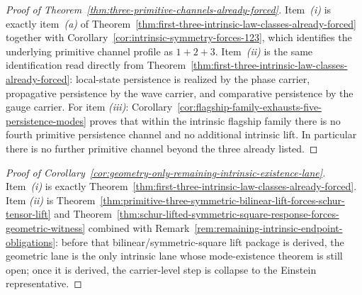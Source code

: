 \begin{proof}[Proof of Theorem~\ref{thm:three-primitive-channels-already-forced}]
\label{proof:thm:three-primitive-channels-already-forced}
Item~\emph{(i)} is exactly item~\emph{(a)} of
Theorem~\ref{thm:first-three-intrinsic-law-classes-already-forced} together
with Corollary~\ref{cor:intrinsic-symmetry-forces-123}, which identifies the
underlying primitive channel profile as \(1+2+3\). Item~\emph{(ii)} is the
same identification read directly from
Theorem~\ref{thm:first-three-intrinsic-law-classes-already-forced}: local-state
persistence is realized by the phase carrier, propagative persistence by the
wave carrier, and comparative persistence by the gauge carrier. For item
\emph{(iii)}:
Corollary~\ref{cor:flagship-family-exhausts-five-persistence-modes} proves
that within the intrinsic flagship family there is no fourth primitive
persistence channel and no additional intrinsic lift. In particular there is
no further primitive channel beyond the three already listed.
\end{proof}

\begin{proof}[Proof of Corollary~\ref{cor:geometry-only-remaining-intrinsic-existence-lane}]
\label{proof:cor:geometry-only-remaining-intrinsic-existence-lane}
Item~\emph{(i)} is exactly
Theorem~\ref{thm:first-three-intrinsic-law-classes-already-forced}. Item
\emph{(ii)} is
Theorem~\ref{thm:primitive-three-symmetric-bilinear-lift-forces-schur-tensor-lift}
and
Theorem~\ref{thm:schur-lifted-symmetric-square-response-forces-geometric-witness}
combined with
Remark~\ref{rem:remaining-intrinsic-endpoint-obligations}: before that
bilinear/symmetric-square lift package is derived, the geometric lane is the
only intrinsic lane whose mode-existence theorem is still open; once it is
derived, the carrier-level step is collapse to the Einstein
representative.
\end{proof}

